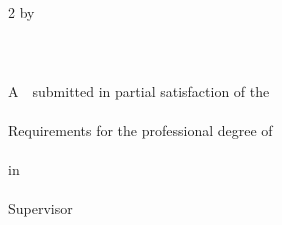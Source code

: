 {\begin{titlepage}
\begin{center}
  \qquad\\
  \qquad\\
  \begin{spacing}{2}
  \xiaosi
  by\\
  \@ename \\

  \qquad\\
  \@cbe\\
  A~\@cdegree~submitted in partial satisfaction of the\\

  \qquad\\
  Requirements for the professional degree of\\
  \@cclass\\

  \vspace{4\baselineskip}
  in\\
  \@ehnu\\
  Supervisor\\
  \@elevel~~ \@esupervisor\\
  \@edate
  \end{spacing}
\end{center}

\end{titlepage}



%

\clearpage
\thispagestyle{empty} %

}
